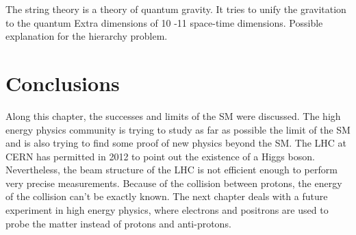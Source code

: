       The string theory is a theory of quantum gravity.
      It tries to unify the gravitation to the quantum 
      Extra dimensions of 10 -11 space-time dimensions.
      Possible explanation for the hierarchy problem.

  \section{Conclusions}

  Along this chapter, the successes and limits of the \gls{SM} were discussed.
  The high energy physics community is trying to study as far as possible the limit of the \gls{SM} and is also trying to find some proof of new physics beyond the \gls{SM}.
  The \gls{LHC} at CERN has permitted in 2012 to point out the existence of a Higgs boson.  
  Nevertheless, the beam structure of the LHC is not efficient enough to perform very precise measurements.
  Because of the collision between protons, the energy of the collision can't be exactly known.
  The next chapter deals with a future experiment in high energy physics, where electrons and positrons are used to probe the matter instead of protons and anti-protons.

